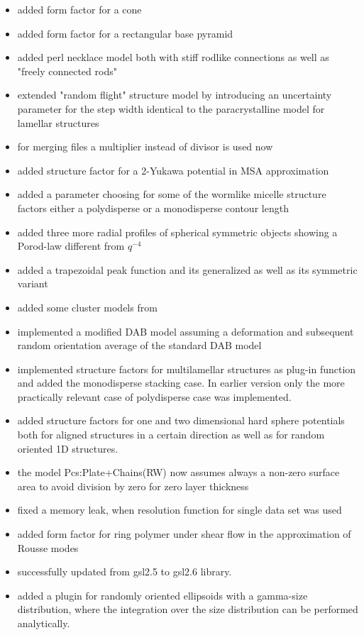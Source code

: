 \begin{description}
\begin{itemize}
    \item added form factor for a cone
    \item added form factor for a rectangular base pyramid
    \item added perl necklace model both with stiff rodlike connections as well as "freely connected rods"
    \item extended "random flight" structure model by introducing an uncertainty parameter for the step width identical to the paracrystalline model for lamellar structures
    \item for merging files a multiplier instead of divisor is used now
    \item added structure factor for a 2-Yukawa potential in MSA approximation
    \item added a parameter choosing for some of the wormlike micelle structure factors either a polydisperse or a monodisperse contour length
    \item added three more radial profiles of spherical symmetric objects showing a Porod-law different from $q^{-4}$
    \item added a trapezoidal peak function and its generalized as well as its symmetric variant
    \item added some cluster models from \cite{Larsen2020}
    \item implemented a modified DAB model assuming a deformation and subsequent random orientation average of the standard DAB model
    \item implemented structure factors for multilamellar structures as plug-in function and added the monodisperse stacking case. In earlier version only the more practically relevant case of polydisperse case was implemented.
    \item added structure factors for one and two dimensional hard sphere potentials both for aligned structures in a certain direction as well as for random oriented 1D structures.
    \item the model Pcs:Plate+Chains(RW) now assumes always a non-zero surface area to avoid division by zero for zero layer thickness
    \item fixed a memory leak, when resolution function for single data set was used
    \item added form factor for ring polymer under shear flow in the approximation of Rousse modes
    \item successfully updated from gsl2.5 to gsl2.6 library.
    \item added a plugin for randomly oriented ellipsoids with a gamma-size distribution, where the integration over the size distribution can be performed analytically.

\end{itemize}
\end{description}
